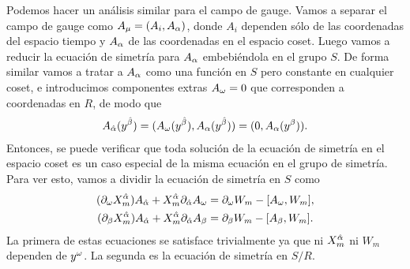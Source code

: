 Podemos hacer un análisis similar para el campo de gauge. Vamos a separar el campo de gauge como $A_\mu=(A_i,A_\alpha)$, donde $A_i$ dependen sólo de las coordenadas del espacio tiempo y $A_{\alpha}$ de las coordenadas en el espacio coset. Luego vamos a reducir la ecuación de simetría para $A_\alpha$ embebiéndola en el grupo $S$. De forma similar vamos a tratar a $A_\alpha$ como una función en $S$ pero constante en cualquier coset, e introducimos componentes extras $A_\omega=0$ que corresponden a coordenadas en $R$, de modo que
\begin{align}
	A_{\hat{\alpha}}(y^{\hat\beta}) = (A_\omega(y^{\hat\beta}),A_\alpha(y^{\hat\beta}))=(0,A_\alpha(y^\beta)).
\end{align}
Entonces, se puede verificar que toda solución de la ecuación de simetría en el espacio coset es un caso especial de la misma ecuación en el grupo de simetría. Para ver esto, vamos a dividir la ecuación de simetría en $S$ como
\begin{align}
	(\partial_\omega X^{\hat{\alpha}}_m)A_{\hat{\alpha}}+X^{\hat{\alpha}}_m\partial_{\hat{\alpha}}A_\omega &=\partial_\omega W_m-[A_\omega,W_m],\\
	(\partial_\beta X^{\hat{\alpha}}_m)A_{\hat{\alpha}}+X^{\hat{\alpha}}_m\partial_{\hat{\alpha}}A_\beta &=\partial_\beta W_m-[A_\beta,W_m].
\end{align}
La primera de estas ecuaciones se satisface trivialmente ya que ni $X^{\hat{\alpha}}_m$ ni $W_m$ dependen de $y^\omega$. La segunda es la ecuación de simetría en $S/R$.

